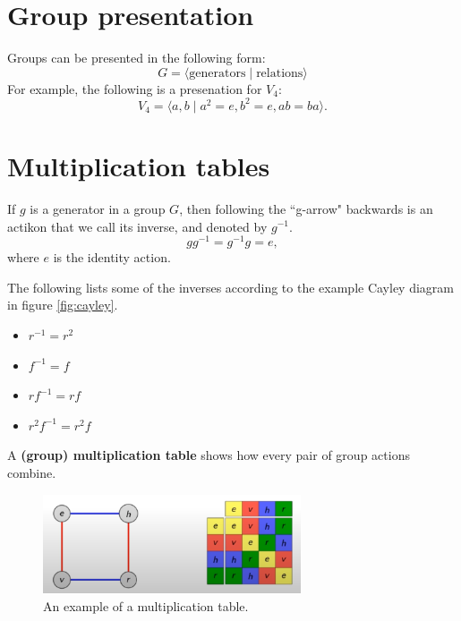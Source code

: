 \documentclass[twocolumn]{article}
\begin{document}
\section{Group presentation}

Groups can be presented in the following form:
\begin{equation}
    G = \langle \text{generators} \mid \text{relations}\rangle
\end{equation}
For example, the following is a presenation for $V_4$:
\begin{equation}
    V_4 = \langle a, b \mid a^2 = e, b^2 = e, ab = ba \rangle .
\end{equation}

\section{Multiplication tables}

If $g$ is a generator in a group $G$, then following the ``g-arrow" backwards is an actikon that we call its inverse, and denoted by $g^{-1}$.
\begin{equation}
    gg^{-1} = g^{-1}g = e,
\end{equation}
where $e$ is the identity action.

The following lists some of the inverses according to the example Cayley diagram in figure \ref{fig:cayley}.
\begin{itemize}
    \item $r^{-1} = r^2$
    \item $f^{-1} = f$
    \item $rf^{-1} = rf$
    \item $r^2f^{-1} = r^2f$
\end{itemize}

A \textbf{(group) multiplication table} shows how every pair of group actions combine.

\begin{figure}[h]
    \centering
    \includegraphics[width = 3in]{figure/multi_table.png}
    \caption{An example of a multiplication table.}
    \label{fig:multi}
\end{figure}
\end{document}
